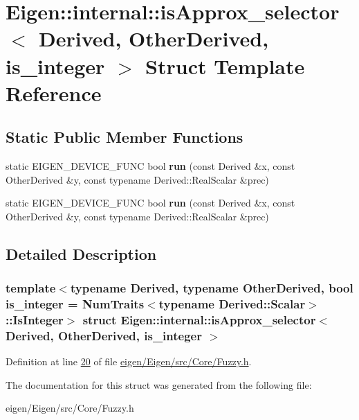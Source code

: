 \hypertarget{struct_eigen_1_1internal_1_1is_approx__selector}{}\section{Eigen\+:\+:internal\+:\+:is\+Approx\+\_\+selector$<$ Derived, Other\+Derived, is\+\_\+integer $>$ Struct Template Reference}
\label{struct_eigen_1_1internal_1_1is_approx__selector}
\subsection*{Static Public Member Functions}
\begin{DoxyCompactItemize}
\item 
\mbox{\label{struct_eigen_1_1internal_1_1is_approx__selector_a93f494392154017563565bb80c10a6fb}} 
static E\+I\+G\+E\+N\+\_\+\+D\+E\+V\+I\+C\+E\+\_\+\+F\+U\+NC bool {\bfseries run} (const Derived \&x, const Other\+Derived \&y, const typename Derived\+::\+Real\+Scalar \&prec)
\item 
\mbox{\label{struct_eigen_1_1internal_1_1is_approx__selector_a93f494392154017563565bb80c10a6fb}} 
static E\+I\+G\+E\+N\+\_\+\+D\+E\+V\+I\+C\+E\+\_\+\+F\+U\+NC bool {\bfseries run} (const Derived \&x, const Other\+Derived \&y, const typename Derived\+::\+Real\+Scalar \&prec)
\end{DoxyCompactItemize}


\subsection{Detailed Description}
\subsubsection*{template$<$typename Derived, typename Other\+Derived, bool is\+\_\+integer = Num\+Traits$<$typename Derived\+::\+Scalar$>$\+::\+Is\+Integer$>$\newline
struct Eigen\+::internal\+::is\+Approx\+\_\+selector$<$ Derived, Other\+Derived, is\+\_\+integer $>$}



Definition at line \hyperlink{eigen_2_eigen_2src_2_core_2_fuzzy_8h_source_l00020}{20} of file \hyperlink{eigen_2_eigen_2src_2_core_2_fuzzy_8h_source}{eigen/\+Eigen/src/\+Core/\+Fuzzy.\+h}.



The documentation for this struct was generated from the following file\+:\begin{DoxyCompactItemize}
\item 
eigen/\+Eigen/src/\+Core/\+Fuzzy.\+h\end{DoxyCompactItemize}
